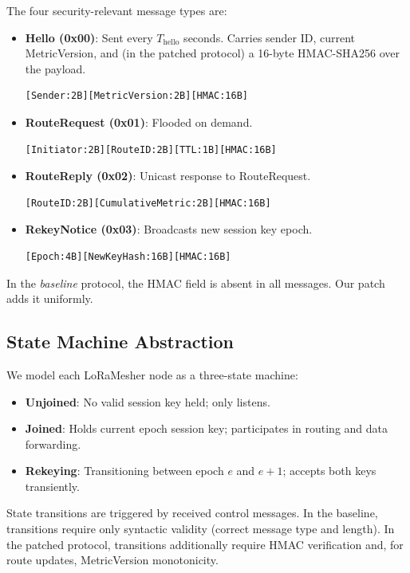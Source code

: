 \documentclass[journal]{IEEEtran}
\begin{document}
The four security-relevant message types are:

\begin{itemize}
  \item \textbf{Hello (0x00)}: Sent every $T_{\text{hello}}$ seconds.
    Carries sender ID, current MetricVersion, and (in the patched
    protocol) a 16-byte HMAC-SHA256 over the payload.
    \begin{lstlisting}
[Sender:2B][MetricVersion:2B][HMAC:16B]
    \end{lstlisting}

  \item \textbf{RouteRequest (0x01)}: Flooded on demand.
    \begin{lstlisting}
[Initiator:2B][RouteID:2B][TTL:1B][HMAC:16B]
    \end{lstlisting}

  \item \textbf{RouteReply (0x02)}: Unicast response to RouteRequest.
    \begin{lstlisting}
[RouteID:2B][CumulativeMetric:2B][HMAC:16B]
    \end{lstlisting}

  \item \textbf{RekeyNotice (0x03)}: Broadcasts new session key epoch.
    \begin{lstlisting}
[Epoch:4B][NewKeyHash:16B][HMAC:16B]
    \end{lstlisting}
\end{itemize}

In the \emph{baseline} protocol, the HMAC field is absent in all
messages. Our patch adds it uniformly.

\subsection{State Machine Abstraction}

We model each LoRaMesher node as a three-state machine:
\begin{itemize}
  \item \textbf{Unjoined}: No valid session key held; only listens.
  \item \textbf{Joined}: Holds current epoch session key; participates
    in routing and data forwarding.
  \item \textbf{Rekeying}: Transitioning between epoch $e$ and $e+1$;
    accepts both keys transiently.
\end{itemize}

State transitions are triggered by received control messages. In the
baseline, transitions require only syntactic validity (correct message
type and length). In the patched protocol, transitions additionally
require HMAC verification and, for route updates, MetricVersion
monotonicity.
\end{document}

